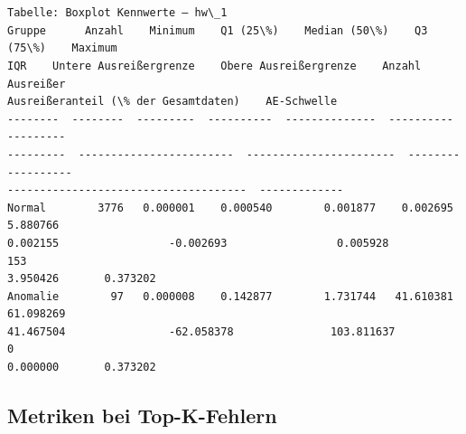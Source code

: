 \documentclass[11pt]{article}
\begin{document}
    \begin{center}
    \end{center}
    { \hspace*{\fill} \\}
    
    \begin{Verbatim}[commandchars=\\\{\}]

Tabelle: Boxplot Kennwerte – hw\_1
Gruppe      Anzahl    Minimum    Q1 (25\%)    Median (50\%)    Q3 (75\%)    Maximum
IQR    Untere Ausreißergrenze    Obere Ausreißergrenze    Anzahl Ausreißer
Ausreißeranteil (\% der Gesamtdaten)    AE-Schwelle
--------  --------  ---------  ----------  --------------  ----------  ---------
---------  ------------------------  -----------------------  ------------------
-------------------------------------  -------------
Normal        3776   0.000001    0.000540        0.001877    0.002695   5.880766
0.002155                 -0.002693                 0.005928                 153
3.950426       0.373202
Anomalie        97   0.000008    0.142877        1.731744   41.610381  61.098269
41.467504                -62.058378               103.811637                   0
0.000000       0.373202
    \end{Verbatim}

    \subsection{Metriken bei
Top-K-Fehlern}\label{metriken-bei-top-k-fehlern}
\end{document}
